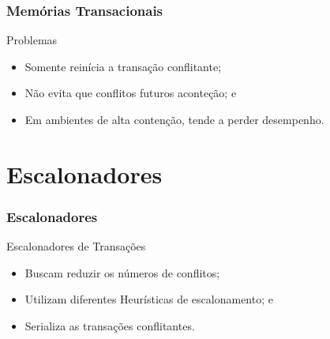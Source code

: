 \documentclass[10pt, pdf,xcolor=pdftex,dvipsnames,table]{beamer}
\begin{document}
\begin{frame} \frametitle{Memórias Transacionais}
    \begin{alertblock}{Problemas}
        \begin{itemize}
        	\item Somente reinícia a transação conflitante;
        	\item Não evita que conflitos futuros aconteção; e
        	\item Em ambientes de alta contenção, tende a perder desempenho.
        \end{itemize}
    \end{alertblock}
\end{frame}

\section{Escalonadores}
\begin{frame} \frametitle{Escalonadores}
\begin{block}{Escalonadores de Transações}
\begin{itemize}
	\item Buscam reduzir os números de conflitos;
	\item Utilizam diferentes Heurísticas de escalonamento; e
	\item Serializa as transações conflitantes.
\end{itemize}
\end{block}
\end{frame}
\end{document}
